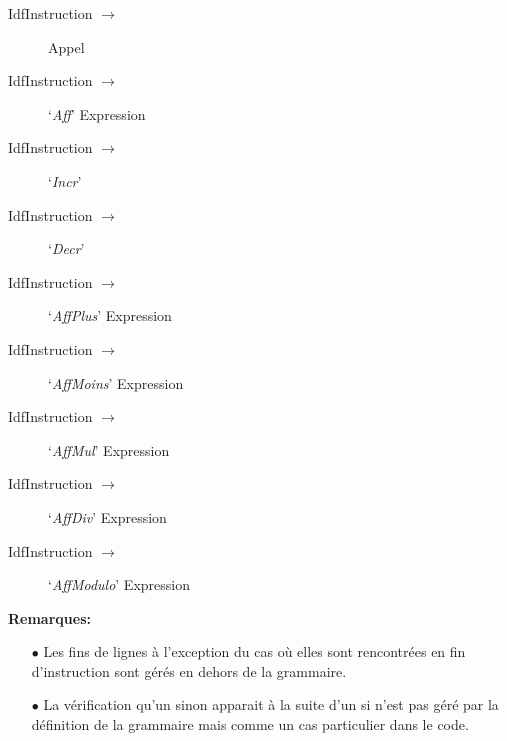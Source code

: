 \begin{description}
   \item[IdfInstruction $\to$] Appel
   \item[IdfInstruction $\to$] `\emph{Aff}' Expression
   \item[IdfInstruction $\to$] `\emph{Incr}'
   \item[IdfInstruction $\to$] `\emph{Decr}'
   \item[IdfInstruction $\to$] `\emph{AffPlus}' Expression
   \item[IdfInstruction $\to$] `\emph{AffMoins}' Expression
   \item[IdfInstruction $\to$] `\emph{AffMul}' Expression
   \item[IdfInstruction $\to$] `\emph{AffDiv}' Expression
   \item[IdfInstruction $\to$] `\emph{AffModulo}' Expression
\end{description}

\hfill\break
\textbf{Remarques:}
\begin{itemize}
   \item[$\bullet$] Les fins de lignes à l'exception du cas où elles sont
      rencontrées en fin d'instruction sont gérés en dehors de la grammaire.
   \item[$\bullet$] La vérification qu'un sinon apparait à la suite d'un si
      n'est pas géré par la définition de la grammaire mais comme un cas
      particulier dans le code.
\end{itemize}
